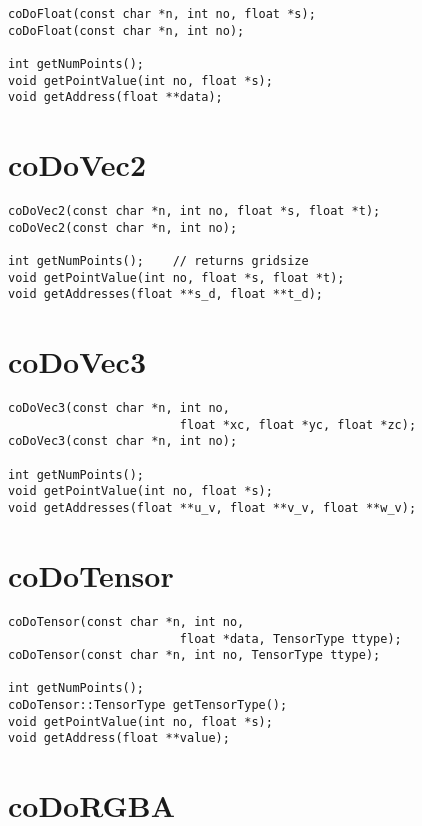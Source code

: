 \begin{verbatim}
coDoFloat(const char *n, int no, float *s);
coDoFloat(const char *n, int no);
 
int getNumPoints();
void getPointValue(int no, float *s);
void getAddress(float **data);
\end{verbatim}
 

\section{coDoVec2}
 
\begin{verbatim}
coDoVec2(const char *n, int no, float *s, float *t);
coDoVec2(const char *n, int no);

int getNumPoints();    // returns gridsize
void getPointValue(int no, float *s, float *t);
void getAddresses(float **s_d, float **t_d);
\end{verbatim}
 

\section{coDoVec3}
 
\begin{verbatim}
coDoVec3(const char *n, int no,
                        float *xc, float *yc, float *zc);
coDoVec3(const char *n, int no);
 
int getNumPoints();
void getPointValue(int no, float *s);
void getAddresses(float **u_v, float **v_v, float **w_v);      
\end{verbatim}
          

\section{coDoTensor}
 
\begin{verbatim}
coDoTensor(const char *n, int no,
                        float *data, TensorType ttype);
coDoTensor(const char *n, int no, TensorType ttype);
 
int getNumPoints();
coDoTensor::TensorType getTensorType();
void getPointValue(int no, float *s);
void getAddress(float **value);      
\end{verbatim}
          

\section{coDoRGBA}
 
